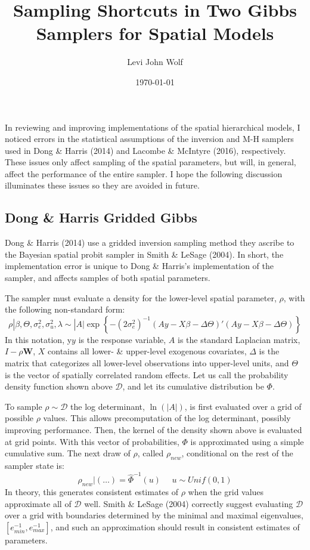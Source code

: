 \documentclass{article}
\title{Sampling Shortcuts in Two Gibbs Samplers for Spatial Models}
\author{Levi John Wolf}
\date{\today}
\begin{document}
\maketitle

In reviewing and improving implementations of the spatial hierarchical models,
I noticed errors in the statistical assumptions of the inversion and M-H
samplers used in Dong \& Harris (2014) and Lacombe \& McIntyre (2016),
respectively. These issues only affect sampling of the spatial parameters, but
will, in general, affect the performance of the entire sampler. I hope the
following discussion illuminates these issues so they are avoided in future.

\subsection{Dong \& Harris Gridded Gibbs}

Dong \& Harris (2014) use a gridded inversion sampling method they ascribe to
the Bayesian spatial probit sampler in Smith \& LeSage (2004).  In
short, the implementation error is unique to Dong \& Harris's implementation of
the sampler, and affects samples of both spatial parameters. 

The sampler must evaluate a density for the lower-level spatial
parameter, $\rho$, with the following non-standard form: \[ \rho | \beta,
\Theta, \sigma^2_e, \sigma^2_u, \lambda \sim |A| \exp\left\{-(2\sigma^2_e)^{-1} \left(Ay - X\beta -
\Delta\Theta\right)'\left(Ay - X\beta - \Delta\Theta\right) \right\}\]
In this notation, y$y$ is the response variable, $A$ is the standard Laplacian
matrix, $I - \rho \mathbf{W}$, $X$ contains all lower- \& upper-level exogenous
covariates, $\Delta$ is the matrix that categorizes all lower-level observations
into upper-level units, and $\Theta$ is the vector of spatially correlated
random effects. Let us call the probability density function shown above
$\mathcal{D}$, and let its cumulative distribution be $\Phi$. 

To sample $\rho \sim \mathcal{D}$ the log determinant, $\ln(|A|)$, is first
evaluated over a grid of possible $\rho$ values.  This allows precomputation of
the log determinant, possibly improving performance. Then, the kernel of the
density shown above is evaluated at grid points. With this vector of
probabilities, $\Phi$ is approximated using a simple cumulative sum. The next
draw of $\rho$, called $\rho_{new}$, conditional on the rest of the sampler
state is:
\[\rho_{new} | (\ldots) = \hat{\Phi}^{-1}(u) \ \ \ \ \ \ u \sim Unif(0,1) \]
In theory, this generates consistent estimates of $\rho$ when the grid values
approximate all of $\mathcal{D}$ well. Smith \& LeSage (2004) correctly suggest
evaluating $\mathcal{D}$ over a grid with boundaries determined by the minimal
and maximal eigenvalues, $[e^{-1}_{min}, e^{-1}_{max}]$, and such an
approximation should result in consistent estimates of parameters. 
\end{document}
